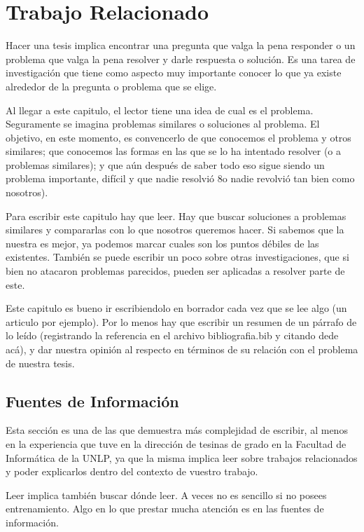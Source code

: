 \chapter{Trabajo Relacionado}
Hacer una tesis implica encontrar una pregunta que valga la pena responder o un problema que valga la pena resolver y darle respuesta o solución. Es una tarea de investigación que tiene como aspecto muy importante conocer lo que ya existe alrededor de la pregunta o problema que se elige. 

Al llegar a este capitulo, el lector tiene una idea de cual es el problema. Seguramente se imagina problemas similares o soluciones al problema. El objetivo, en este momento, es convencerlo de que conocemos el problema y otros similares; que conocemos las formas en las que se lo ha intentado resolver (o a problemas similares); y que aún después de saber todo eso sigue siendo un problema importante, difícil y que nadie resolvió 8o nadie revolvió tan bien como nosotros).

Para escribir este capitulo hay que leer. Hay que buscar soluciones a problemas similares y compararlas con lo que nosotros queremos hacer. Si sabemos que la nuestra es mejor, ya podemos marcar cuales son los puntos débiles de las existentes. También se puede escribir un poco sobre otras investigaciones, que si bien no atacaron problemas parecidos, pueden ser aplicadas a resolver parte de este. 

Este capitulo es bueno ir escribiendolo en borrador cada vez que se lee algo (un articulo por ejemplo). Por lo menos hay que escribir un resumen de un párrafo de lo leído (registrando la referencia en el archivo bibliografia.bib y citando dede acá), y dar nuestra opinión al respecto en términos de su relación con el problema de nuestra tesis.

\section{Fuentes de Información}

Esta sección es una de las que demuestra más complejidad de escribir, al menos en la experiencia que tuve en la dirección de tesinas de grado en la Facultad de Informática de la UNLP, ya que la misma implica leer sobre trabajos relacionados y poder explicarlos dentro del contexto de vuestro trabajo. 

Leer implica también buscar dónde leer. A veces no es sencillo si no posees entrenamiento. Algo en lo que prestar mucha atención es en las fuentes de información. 

